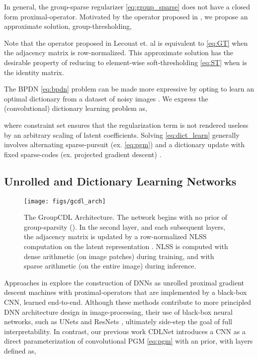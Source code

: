 \documentclass[lettersize,journal]{IEEEtran}
\begin{document}
In general, the group-sparse
regularizer \eqref{eq:group_sparse} does not have a closed form proximal-operator. 
Motivated by the operator proposed in
\cite{lecouat2020nonlocal}, we propose an approximate solution,
group-thresholding,

Note that the operator proposed in Lecouat et. al \cite{lecouat2020nonlocal}
is equivalent to \eqref{eq:GT} when the adjacency matrix is row-normalized. This
approximate solution has the desirable property of reducing to element-wise
soft-thresholding \eqref{eq:ST} when  is the identity matrix. 

The BPDN \eqref{eq:bpdn} problem can be made more expressive by opting to learn
an optimal dictionary from a dataset of noisy images . We express
the (convolutional) dictionary learning problem as,

where constraint set  ensures that the regularization term is not rendered useless by
an arbitrary scaling of latent coefficients. Solving \eqref{eq:dict_learn}
generally involves alternating sparse-pursuit (ex. \eqref{eq:pgm}) and a
dictionary update with fixed sparse-codes (ex. projected gradient descent)
\cite{mairal2009online}. 

\subsection{Unrolled and Dictionary Learning Networks}
\begin{figure*}[thb]
    \centering
    \texttt{[image: figs/gcdl\_arch]}
    \caption{The GroupCDL Architecture. The network begins with no prior of group-sparsity (). In the second layer, and each subsequent  layers, the adjacency matrix  is updated by a row-normalized NLSS computation on the latent representation . NLSS is computed with dense arithmetic (on image patches) during training, and with sparse arithmetic (on the entire image) during inference.}
    \label{fig:arch}
\end{figure*}
 
Approaches in \cite{ongie2020deep, Gilton2019, deqWillet2021} explore the
construction of DNNs as unrolled proximal gradient descent machines with
proximal-operators that are implemented by a black-box CNN, learned end-to-end. 
Although these methods contribute to more principled DNN architecture design in image-processing, their use of black-box neural networks, such as UNets
\cite{unet} and ResNets \cite{he2016deep}, ultimately side-step the goal of full interpretability. In contrast, our previous work CDLNet \cite{janjusevicCDLNet2022} introduces a CNN as a direct parameterization of convolutional PGM \eqref{eq:pgm} with an  prior, with layers defined as,
\end{document}
